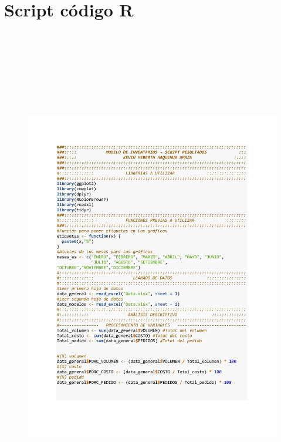 \section{Script código R}
\begin{figure}[h!]
        \begin{tcolorbox}[colback=white, colframe=black, boxrule=1.5pt, sharp corners=all]
            {\includegraphics[width=\linewidth, height=22cm, trim=2.5cm 2.75cm 2.5cm 2.5cm, clip]{images/script1.pdf}}
        \end{tcolorbox}
\end{figure}

